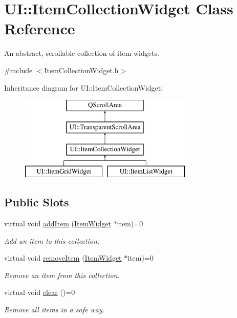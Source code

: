 \hypertarget{class_u_i_1_1_item_collection_widget}{\section{U\-I\-:\-:Item\-Collection\-Widget Class Reference}
\label{class_u_i_1_1_item_collection_widget}
}


An abstract, scrollable collection of item widgets.  




{\ttfamily \#include $<$Item\-Collection\-Widget.\-h$>$}

Inheritance diagram for U\-I\-:\-:Item\-Collection\-Widget\-:\begin{figure}[H]
\begin{center}
\leavevmode
\includegraphics[height=4.000000cm]{class_u_i_1_1_item_collection_widget}
\end{center}
\end{figure}
\subsection*{Public Slots}
\begin{DoxyCompactItemize}
\item 
virtual void \hyperlink{class_u_i_1_1_item_collection_widget_af876eea5efb285479e70e69085b10049}{add\-Item} (\hyperlink{class_u_i_1_1_item_widget}{Item\-Widget} $\ast$item)=0
\begin{DoxyCompactList}\small\item\em Add an item to this collection. \end{DoxyCompactList}\item 
virtual void \hyperlink{class_u_i_1_1_item_collection_widget_ad68458017b2d4c59db8a5cafa83135de}{remove\-Item} (\hyperlink{class_u_i_1_1_item_widget}{Item\-Widget} $\ast$item)=0
\begin{DoxyCompactList}\small\item\em Remove an item from this collection. \end{DoxyCompactList}\item 
virtual void \hyperlink{class_u_i_1_1_item_collection_widget_a5c4987c6b6e92d3ed64c4691abdd20ad}{clear} ()=0
\begin{DoxyCompactList}\small\item\em Remove all items in a safe way. \end{DoxyCompactList}\end{DoxyCompactItemize}
